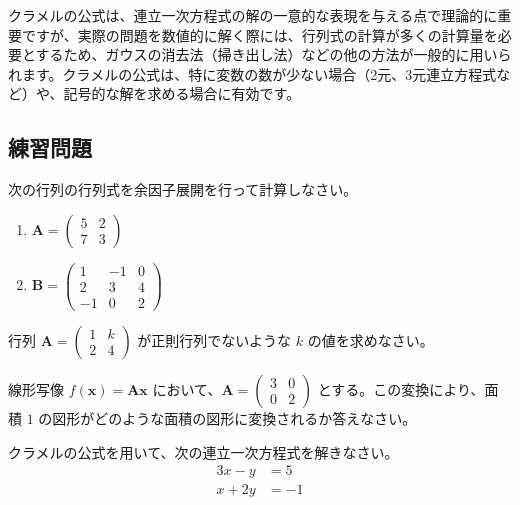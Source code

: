 \begin{rmk*}
クラメルの公式は、連立一次方程式の解の一意的な表現を与える点で理論的に重要ですが、実際の問題を数値的に解く際には、行列式の計算が多くの計算量を必要とするため、ガウスの消去法（掃き出し法）などの他の方法が一般的に用いられます。クラメルの公式は、特に変数の数が少ない場合（2元、3元連立方程式など）や、記号的な解を求める場合に有効です。
\end{rmk*}

\subsection{練習問題}

\begin{quiz}
次の行列の行列式を余因子展開を行って計算しなさい。
\begin{enumerate}
    \item $\bm{A} = \begin{pmatrix} 5 & 2 \\ 7 & 3 \end{pmatrix}$
    \item $\bm{B} = \begin{pmatrix} 1 & -1 & 0 \\ 2 & 3 & 4 \\ -1 & 0 & 2 \end{pmatrix}$ 
\end{enumerate}
\end{quiz}

\begin{quiz}
行列 $\bm{A} = \begin{pmatrix} 1 & k \\ 2 & 4 \end{pmatrix}$ が正則行列でないような $k$ の値を求めなさい。
\end{quiz}

\begin{quiz}
線形写像 $f(\bm{x}) = \bm{A}\bm{x}$ において、$\bm{A} = \begin{pmatrix} 3 & 0 \\ 0 & 2 \end{pmatrix}$ とする。この変換により、面積 $1$ の図形がどのような面積の図形に変換されるか答えなさい。
\end{quiz}

\begin{quiz}
クラメルの公式を用いて、次の連立一次方程式を解きなさい。
\begin{align*} 3x - y &= 5 \\ x + 2y &= -1 \end{align*}
\end{quiz}